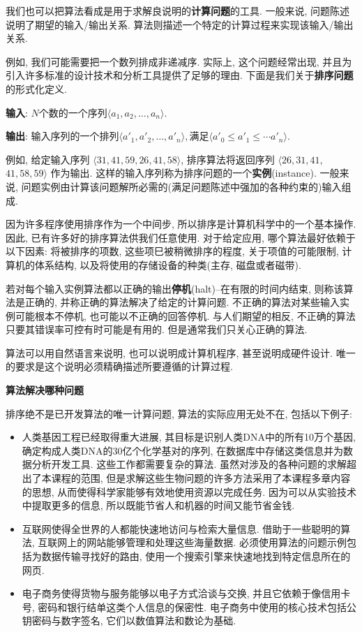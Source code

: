 \documentclass[oneside,10pt]{ctexbook}
\begin{document}
我们也可以把算法看成是用于求解良说明的\textbf{计算问题}的工具. 一般来说, 问题陈述说明了期望的输入/输出关系. 算法则描述一个特定的计算过程来实现该输入/输出关系.

例如, 我们可能需要把一个数列排成非递减序. 实际上, 这个问题经常出现, 并且为引入许多标准的设计技术和分析工具提供了足够的理由. 下面是我们关于\textbf{排序问题}的形式化定义.

\textbf{输入}: $N$个数的一个序列$\langle a_1, a_2, \dots, a_n\rangle$.

\textbf{输出}: 输入序列的一个排列$\langle a'_1, a'_2, \dots, a'_n\rangle , \text{满足}\langle a'_0\leq a'_1 \leq\cdots a'_n\rangle$.

例如, 给定输入序列 $\langle 31, 41, 59, 26, 41, 58\rangle$, 排序算法将返回序列 $\langle 26, 31, 41,$ $ 41, 58, 59\rangle$ 作为输出. 这样的输入序列称为排序问题的一个\textbf{实例}(instance). 一般来说, 问题实例由计算该问题解所必需的(满足问题陈述中强加的各种约束的)输入组成.

因为许多程序使用排序作为一个中间步, 所以排序是计算机科学中的一个基本操作. 因此, 已有许多好的排序算法供我们任意使用. 对于给定应用, 哪个算法最好依赖于以下因素: 将被排序的项数, 这些项巳被稍微排序的程度, 关于项值的可能限制, 计算机的体系结构, 以及将使用的存储设备的种类(主存, 磁盘或者磁带).

若对每个输入实例算法都以正确的输出\textbf{停机}(halt)--在有限的时间内结束, 则称该算法是正确的, 并称正确的算法解决了给定的计算问题. 不正确的算法对某些输入实例可能根本不停机, 也可能以不正确的回答停机. 与人们期望的相反, 不正确的算法只要其错误率可控有时可能是有用的. 但是通常我们只关心正确的算法.

算法可以用自然语言来说明, 也可以说明成计算机程序, 甚至说明成硬件设计. 唯一的要求是这个说明必须精确描述所要遵循的计算过程.

\textbf{算法解决哪种问题}

排序绝不是已开发算法的唯一计算问题, 算法的实际应用无处不在, 包括以下例子:

\begin{itemize}
    \item 人类基因工程已经取得重大进展, 其目标是识别人类DNA中的所有10万个基因, 确定构成人类DNA的30亿个化学基对的序列, 在数据库中存储这类信息并为数据分析开发工具. 这些工作都需要复杂的算法. 虽然对涉及的各种问题的求解超出了本课程的范围, 但是求解这些生物问题的许多方法采用了本课程多章内容的思想, 从而使得科学家能够有效地使用资源以完成任务. 因为可以从实验技术中提取更多的信息, 所以既能节省人和机器的时间又能节省金钱.
    \item 互联网使得全世界的人都能快速地访问与检索大量信息. 借助于一些聪明的算法, 互联网上的网站能够管理和处理这些海量数据. 必须使用算法的问题示例包括为数据传输寻找好的路由, 使用一个搜索引擎来快速地找到特定信息所在的网页.
    \item 电子商务使得货物与服务能够以电子方式洽谈与交换, 并且它依赖于像信用卡号, 密码和银行结单这类个人信息的保密性. 电子商务中使用的核心技术包括公钥密码与数字签名, 它们以数值算法和数论为基础.
\end{itemize}
\end{document}
